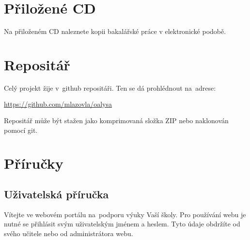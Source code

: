 \documentclass[thesis=B,czech]{FITthesis}[2012/06/26]
\begin{document}
\chapter{Přiložené CD}


Na přiloženém CD naleznete kopii bakalářské práce v elektronické podobě.

\begin{figure}
\end{figure}


\chapter{Repositář}


Celý projekt žije v~github repositáři. Ten se dá prohlédnout na~adrese:

\begin{center}
 \url{https://github.com/mlazovla/oalysa}
\end{center}
 
 Repositář může být stažen jako komprimovaná složka ZIP nebo naklonován pomocí git.

\begin{figure}
\end{figure}

\chapter{Příručky}

\section{Uživatelská příručka}

Vítejte ve webovém portálu na~podporu výuky Vaší školy. Pro používání webu je nutné se přihlásit svým uživatelským jménem a heslem. Tyto údaje obdržíte od svého učitele nebo od administrátora webu.
\end{document}
